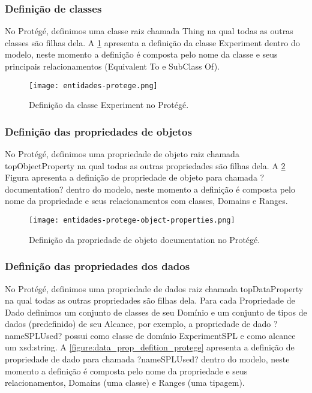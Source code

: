 \subsubsection{Definição de classes}
No Protégé, definimos uma classe raiz chamada Thing na qual todas as outras classes são filhas dela. A \ref{figure:class_defition_protege} apresenta a definição da classe Experiment dentro do modelo, neste momento a definição é composta pelo nome da classe e seus principais relacionamentos (Equivalent To e SubClass Of).

\begin{figure}[]
	\centering 
	\texttt{[image: entidades-protege.png]}
	\caption{Definição da classe Experiment no Protégé.}
	\label{figure:class_defition_protege}
\end{figure}

\subsubsection{Definição das propriedades de objetos}
No Protégé, definimos uma propriedade de objeto raiz chamada topObjectProperty na qual todas as outras propriedades são filhas dela. A \ref{figure:object_prop_defition_protege} Figura apresenta a definição de propriedade de objeto para chamada ?documentation? dentro do modelo, neste momento a definição é composta pelo nome da propriedade e seus relacionamentos com classes, Domains e Ranges.

\begin{figure}[htb]
	\centering 
	\texttt{[image: entidades-protege-object-properties.png]}
	\caption{Definição da propriedade de objeto documentation no Protégé.}
	\label{figure:object_prop_defition_protege}
\end{figure}

\subsubsection{Definição das propriedades dos dados}
No Protégé, definimos uma propriedade de dados raiz chamada topDataProperty na qual todas as outras propriedades são filhas dela. Para cada Propriedade de Dado definimos um conjunto de classes de seu Domínio e um conjunto de tipos de dados (predefinido) de seu Alcance, por exemplo, a propriedade de dado ?nameSPLUsed? possui como classe de domínio ExperimentSPL e como alcance um xsd:string. A \ref{figure:data_prop_defition_protege} apresenta a definição de propriedade de dado para chamada ?nameSPLUsed? dentro do modelo, neste momento a definição é composta pelo nome da propriedade e seus relacionamentos, Domains (uma classe) e Ranges (uma tipagem).

